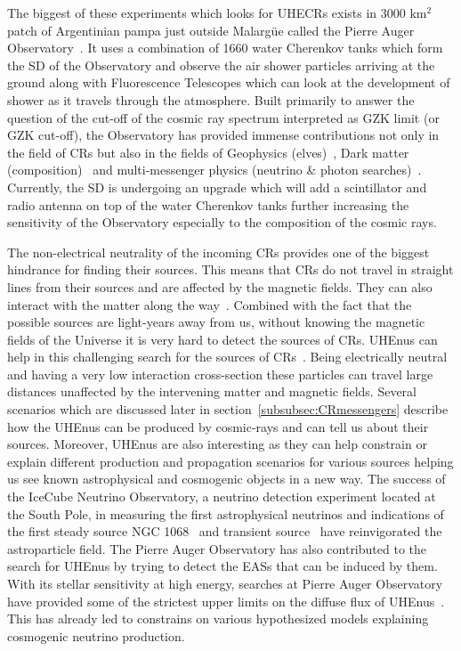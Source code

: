 The biggest of these experiments which looks for \glspl{UHECR} exists in 3000 km$^2$ patch of Argentinian pampa just outside Malargüe called the Pierre Auger Observatory~\cite{Auger:2015}. It uses a combination of 1660 water Cherenkov tanks which form the \gls{SD} of the Observatory and observe the air shower particles arriving at the ground along with Fluorescence Telescopes which can look at the development of shower as it travels through the atmosphere. Built primarily to answer the question of the cut-off of the cosmic ray spectrum interpreted as \gls{GZK} limit (or GZK cut-off), the Observatory has provided immense contributions not only in the field of \glspl{CR} but also in the fields of Geophysics (elves)~\cite{Mussa_2022}, Dark matter (composition)~\cite{Abreu_2023} and multi-messenger physics (neutrino \& photon searches)~\cite{Aab_2019_point,Auger_photons_2022}. Currently, the \gls{SD} is undergoing an upgrade which will add a scintillator and radio antenna on top of the water Cherenkov tanks further increasing the sensitivity of the Observatory especially to the composition of the cosmic rays.

The non-electrical neutrality of the incoming \glspl{CR} provides one of the biggest hindrance for finding their sources. This means that \glspl{CR} do not travel in straight lines from their sources and are affected by the magnetic fields. They can also interact with the matter along the way~\cite{bister2024largescaleanisotropyfluxdemagnification, ALLARD201233}. Combined with the fact that the possible sources are light-years away from us, without knowing the magnetic fields of the Universe it is very hard to detect the sources of \glspl{CR}. \Glspl{UHEnu} can help in this challenging search for the sources of \glspl{CR}~\cite{UHEcorrelation_2016}. Being electrically neutral and having a very low interaction cross-section these particles can travel large distances unaffected by the intervening matter and magnetic fields. Several scenarios which are discussed later in section~\ref{subsubsec:CRmessengers} describe how the \glspl{UHEnu} can be produced by cosmic-rays and can tell us about their sources. Moreover, \glspl{UHEnu} are also interesting as they can help constrain or explain different production and propagation scenarios for various sources helping us see known astrophysical and cosmogenic objects in a new way. The success of the IceCube Neutrino Observatory, a neutrino detection experiment located at the South Pole, in measuring the first astrophysical neutrinos and indications of the first steady source NGC 1068~\cite{Icecube_2022} and transient source~\cite{Icecube_txs} have reinvigorated the astroparticle field. The Pierre Auger Observatory has also contributed to the search for \glspl{UHEnu} by trying to detect the \glspl{EAS} that can be induced by them. With its stellar sensitivity at high energy, searches at Pierre Auger Observatory have provided some of the strictest upper limits on the diffuse flux of \glspl{UHEnu}~\cite{Aab_2019_diffuse}. This has already led to constrains on various hypothesized models explaining cosmogenic neutrino production.

